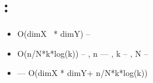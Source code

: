 \documentclass[a4paper]{article}
\newcommand\liststyleLvi{%
\renewcommand\labelitemi{{\textbullet}}
\renewcommand\labelitemii{${\circ}$}
\renewcommand\labelitemiii{${\blacksquare}$}
\renewcommand\labelitemiv{{\textbullet}}
}
\begin{document}
\section[{\CYRA}{\cyrn}{\cyra}{\cyrl}{\cyri}{\cyrt}{\cyri}{\cyrch}{\cyre}{\cyrs}{\cyrk}{\cyra}{\cyrya}
{\cyrs}{\cyrl}{\cyro}{\cyrzh}{\cyrn}{\cyro}{\cyrs}{\cyrt}{\cyrsftsn}
{\cyra}{\cyrl}{\cyrg}{\cyro}{\cyrr}{\cyri}{\cyrt}{\cyrm}{\cyra} {\cyrd}{\cyrl}{\cyrya}
{\cyrp}{\cyra}{\cyrr}{\cyra}{\cyrl}{\cyrl}{\cyre}{\cyrl}{\cyrsftsn}{\cyrn}{\cyro}{\cyrg}{\cyro}
{\cyrs}{\cyrl}{\cyru}{\cyrch}{\cyra}{\cyrya}:]{{\CYRA}{\cyrn}{\cyra}{\cyrl}{\cyri}{\cyrt}{\cyri}{\cyrch}{\cyre}{\cyrs}{\cyrk}{\cyra}{\cyrya}
{\cyrs}{\cyrl}{\cyro}{\cyrzh}{\cyrn}{\cyro}{\cyrs}{\cyrt}{\cyrsftsn}
{\cyra}{\cyrl}{\cyrg}{\cyro}{\cyrr}{\cyri}{\cyrt}{\cyrm}{\cyra} {\cyrd}{\cyrl}{\cyrya}
\foreignlanguage{english}{\textcyrillic{{\cyrp}}}{\cyra}{\cyrr}{\cyra}{\cyrl}{\cyrl}{\cyre}{\cyrl}{\cyrsftsn}{\cyrn}{\cyro}{\cyrg}{\cyro}
{\cyrs}{\cyrl}{\cyru}{\cyrch}{\cyra}{\cyrya}:}
\liststyleLvi
\begin{itemize}
\item {
O(dimX \ * dimY) -- \foreignlanguage{russian}{{\cyrs}{\cyrl}{\cyro}{\cyrzh}{\cyrn}{\cyro}{\cyrs}{\cyrt}{\cyrsftsn}
{\cyrd}{\cyrl}{\cyrya} {\cyrm}{\cyra}{\cyrr}{\cyrk}{\cyri}{\cyrr}{\cyro}{\cyrv}{\cyrk}{\cyri}
{\cyrk}{\cyro}{\cyrm}{\cyrp}{\cyro}{\cyrn}{\cyre}{\cyrn}{\cyrt}
{\cyrb}{\cyri}{\cyrn}{\cyra}{\cyrr}{\cyrn}{\cyro}{\cyrg}{\cyro}
{\cyri}{\cyrz}{\cyro}{\cyrb}{\cyrr}{\cyra}{\cyrzh}{\cyre}{\cyrn}{\cyri}{\cyrya}}}
\item {
O(n/N*k*log(k)) -- \foreignlanguage{russian}{{\cyrs}{\cyrl}{\cyro}{\cyrzh}{\cyrn}{\cyro}{\cyrs}{\cyrt}{\cyrsftsn}
{\cyrd}{\cyrl}{\cyrya} {\cyra}{\cyrl}{\cyrg}{\cyro}{\cyrr}{\cyri}{\cyrt}{\cyrm}{\cyra}
{\CYRG}{\cyrr}{\cyrerev}{\cyrh}{\cyre}{\cyrm}{\cyra}, {\cyrg}{\cyrd}{\cyre} }n ---\foreignlanguage{russian}{
{\cyrch}{\cyri}{\cyrs}{\cyrl}{\cyro} {\cyrk}{\cyro}{\cyrm}{\cyrp}{\cyro}{\cyrn}{\cyre}{\cyrn}{\cyrt}, }k --
\foreignlanguage{russian}{{\cyrs}{\cyrr}{\cyre}{\cyrd}{\cyrn}{\cyre}{\cyre}
{\cyrk}{\cyro}{\cyrl}{\cyri}{\cyrch}{\cyre}{\cyrs}{\cyrt}{\cyrv}{\cyro} {\cyrt}{\cyro}{\cyrch}{\cyre}{\cyrk} {\cyrv}
{\cyrk}{\cyro}{\cyrm}{\cyrp}{\cyro}{\cyrn}{\cyre}{\cyrn}{\cyrt}{\cyre}, }N --
\foreignlanguage{russian}{{\cyrk}{\cyro}{\cyrl}{\cyri}{\cyrch}{\cyre}{\cyrs}{\cyrt}{\cyrv}{\cyro}
{\cyrp}{\cyrr}{\cyro}{\cyrc}{\cyre}{\cyrs}{\cyrs}{\cyro}{\cyrv}}}
\item {
\foreignlanguage{russian}{{\CYRI}{\cyrt}{\cyro}{\cyrg}{\cyro}{\cyrv}{\cyra}{\cyrya}
{\cyrs}{\cyrl}{\cyro}{\cyrzh}{\cyrn}{\cyro}{\cyrs}{\cyrt}{\cyrsftsn}
{\cyra}{\cyrl}{\cyrg}{\cyro}{\cyrr}{\cyri}{\cyrt}{\cyrm}{\cyra} --- }O(dimX * dimY+ n/N*k*log(k))}
\end{itemize}
\end{document}
